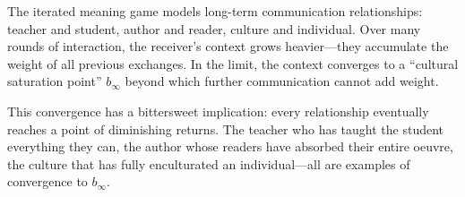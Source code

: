 \begin{interpretation}
The iterated meaning game models long-term communication relationships:
teacher and student, author and reader, culture and individual.  Over many
rounds of interaction, the receiver's context grows heavier---they accumulate
the weight of all previous exchanges.  In the limit, the context converges
to a ``cultural saturation point'' $b_{\infty}$ beyond which further
communication cannot add weight.

This convergence has a bittersweet implication: every relationship eventually
reaches a point of diminishing returns.  The teacher who has taught the
student everything they can, the author whose readers have absorbed their
entire oeuvre, the culture that has fully enculturated an individual---all
are examples of convergence to $b_{\infty}$.
\end{interpretation}

